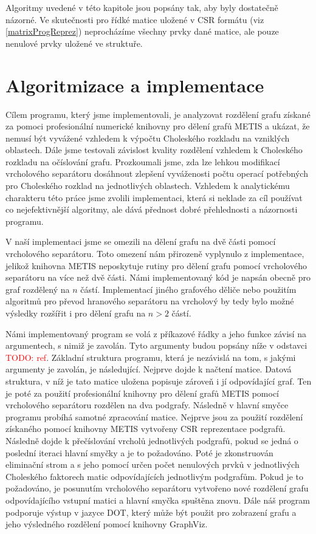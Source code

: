 \documentclass[11pt,american,czech,oneside]{book}
\theoremstyle{plain}
\theoremstyle{definition}
\newcommand{\TODO}[1]{\textcolor{red}{TODO: #1}}
\begin{document}
Algoritmy uvedené v této kapitole jsou popsány tak, aby byly dostatečně názorné. Ve skutečnosti pro řídké matice uložené v CSR formátu (viz \ref{matrixProgReprez}) neprocházíme všechny prvky dané matice, ale pouze nenulové prvky uložené ve struktuře.


\chapter{Algoritmizace a implementace}

Cílem programu, který jsme implementovali, je analyzovat rozdělení grafu získané za pomoci profesionální numerické knihovny pro dělení grafů METIS a ukázat, že nemusí být vyvážené vzhledem k výpočtu Choleského rozkladu na vzniklých oblastech. Dále jsme testovali závislost kvality rozdělení vzhledem k Choleského rozkladu na očíslování grafu. Prozkoumali jsme, zda lze lehkou modifikací vrcholového separátoru dosáhnout zlepšení vyváženosti počtu operací potřebných pro Choleského rozklad na jednotlivých oblastech. Vzhledem k analytickému charakteru této práce jsme zvolili implementaci, která si neklade za cíl používat co nejefektivnější algoritmy, ale dává přednost dobré přehlednosti a názornosti programu.

V naší implementaci jsme se omezili na dělení grafu na dvě části pomocí vrcholového separátoru. Toto omezení nám přirozeně vyplynulo z implementace, jelikož knihovna METIS neposkytuje rutiny pro dělení grafu pomocí vrcholového separátoru na více než dvě části. Námi implementovaný kód je napsán obecně pro graf rozdělený na $n$ částí. Implementací jiného grafového děliče nebo použitím algoritmů pro převod hranového separátoru na vrcholový by tedy bylo možné výsledky rozšířit i pro dělení grafu na $n>2$ částí.

Námi implementovaný program se volá z příkazové řádky a jeho funkce závisí na argumentech, s nimiž je zavolán. Tyto argumenty budou popsány níže v odstavci \TODO{ref}. Základní struktura programu, která je nezávislá na tom, s jakými argumenty je zavolán, je následující. Nejprve dojde k načtení matice. Datová struktura, v níž je tato matice uložena popisuje zároveň i jí odpovídající graf. Ten je poté za použití profesionální knihovny pro dělení grafů METIS pomocí vrcholového separátoru rozdělen na dva podgrafy. Následně v hlavní smyčce programu probíhá samotné zpracování matice. Nejprve jsou za použití rozdělení získaného pomocí knihovny METIS vytvořeny CSR reprezentace podgrafů. Následně dojde k přečíslování vrcholů jednotlivých podgrafů, pokud se jedná o poslední iteraci hlavní smyčky a je to požadováno. Poté je zkonstruován eliminační strom a s jeho pomocí určen počet nenulových prvků v jednotlivých Choleského faktorech matic odpovídajících jednotlivým podgrafům. Pokud je to požadováno, je posunutím vrcholového separátoru vytvořeno nové rozdělení grafu odpovídajícího vstupní matici a hlavní smyčka spuštěna znovu. Dále náš program podporuje výstup v jazyce DOT, který může být použit pro zobrazení grafu a jeho výsledného rozdělení pomocí knihovny GraphViz.
\end{document}

